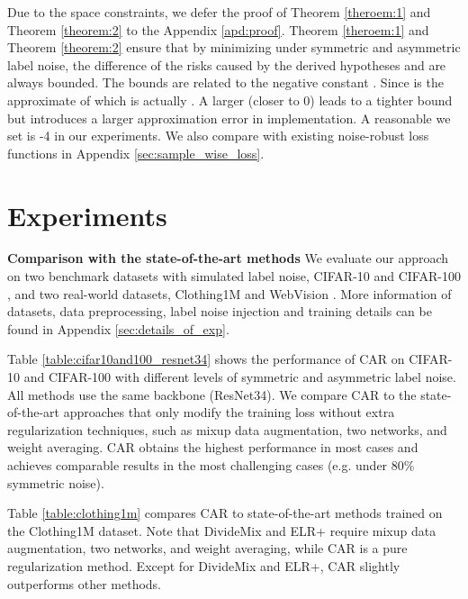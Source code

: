 \documentclass{article}
\begin{document}
Due to the space constraints, we defer the proof of Theorem \ref{theroem:1} and Theorem \ref{theorem:2} to the Appendix \ref{apd:proof}. Theorem \ref{theroem:1} and Theorem \ref{theorem:2} ensure that by minimizing  under symmetric and asymmetric label noise, the difference of the risks caused by the derived hypotheses  and  are always bounded. The bounds are related to the negative constant . Since  is the approximate of  which is actually . A larger  (closer to 0) leads to a tighter bound but introduces a larger approximation error in implementation. A reasonable  we set is -4 in our experiments. We also compare  with existing noise-robust loss functions in Appendix \ref{sec:sample_wise_loss}. 













\section{Experiments}


\textbf{Comparison with the state-of-the-art methods} We evaluate our approach on two benchmark datasets with simulated label noise, CIFAR-10 and CIFAR-100 \cite{krizhevsky2009learning}, and two real-world datasets, Clothing1M \cite{xiao2015learning} and WebVision \cite{li2017webvision}. More information of datasets, data preprocessing, label noise injection and training details can be found in Appendix \ref{sec:details_of_exp}. 

Table \ref{table:cifar10and100_resnet34} shows the performance of CAR on CIFAR-10 and CIFAR-100 with different levels of symmetric and asymmetric label noise. All methods use the same backbone (ResNet34). We compare CAR to the state-of-the-art approaches that only modify the training loss without extra regularization techniques, such as mixup data augmentation, two networks, and weight averaging. CAR obtains the highest performance in most cases and achieves comparable results in the most challenging cases (e.g. under 80\% symmetric noise).

Table \ref{table:clothing1m} compares CAR to state-of-the-art methods trained on the Clothing1M dataset. Note that DivideMix and ELR+ require mixup data augmentation, two networks, and weight averaging, while CAR is a pure regularization method. Except for DivideMix and ELR+, CAR slightly outperforms other methods.
\end{document}
